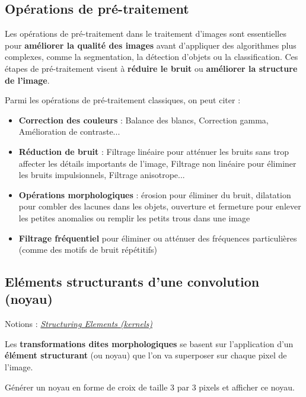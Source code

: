 \documentclass[a4paper,11pt,titlepage]{article} %
\begin{document}
\subsection{Opérations de pré-traitement}

Les opérations de pré-traitement dans le traitement d'images sont essentielles pour \textbf{améliorer la qualité des images} avant d'appliquer des algorithmes plus complexes, comme la segmentation, la détection d'objets ou la classification. Ces étapes de pré-traitement visent à \textbf{réduire le bruit} ou \textbf{améliorer la structure de l'image}. 

Parmi les opérations de pré-traitement classiques, on peut citer :

\begin{itemize}
	\item \textbf{Correction des couleurs} : Balance des blancs, Correction gamma, Amélioration de contraste...
	\item \textbf{Réduction de bruit} : Filtrage linéaire pour atténuer les bruits sans trop affecter les détails importants de l'image, Filtrage non linéaire pour éliminer les bruits impulsionnels, Filtrage anisotrope...
	\item \textbf{Opérations morphologiques} : érosion pour éliminer du bruit, dilatation pour combler des lacunes dans les objets, ouverture et fermeture pour enlever les petites anomalies ou remplir les petits trous dans une image
	\item \textbf{Filtrage fréquentiel} pour éliminer ou atténuer des fréquences particulières (comme des motifs de bruit répétitifs) 
\end{itemize}

\subsection{Eléments structurants d'une convolution (noyau)}

\begin{mdframed}[style=sidebar,frametitle={}]
Notions : \href{https://iogs-lense-training.github.io/image-processing/contents/opencv_erod_dila.html#kernels-for-erosion-and-dilation}{\textit{Structuring Elements (kernels)}} 
\end{mdframed}

Les \textbf{transformations dites morphologiques} se basent sur l'application d'un \textbf{élément structurant} (ou noyau) que l'on va superposer sur chaque pixel de l'image. 

\Manip Générer un noyau en forme de croix de taille 3 par 3 pixels et afficher ce noyau.
\end{document}
